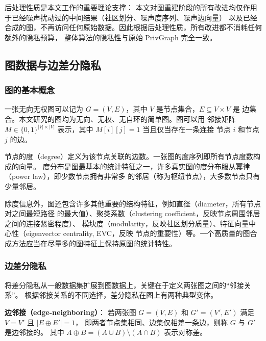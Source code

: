 \par 后处理性质是本文工作的重要理论支撑：
本文对图重建阶段的所有改进均仅作用于已经噪声扰动过的中间结果（社区划分、噪声度序列、噪声边向量）
以及已经合成的图，不再访问任何原始数据。因此根据后处理性质，所有改进都不消耗任何额外的隐私预算，
整体算法的隐私性与原始 PrivGraph 完全一致。

\subsection{图数据与边差分隐私}

\subsubsection{图的基本概念}

\par 一张无向无权图可以记为 $G = (V, E)$，其中 $V$ 是节点集合，$E \subseteq V \times V$ 是
边集合。本文研究的图均为无向、无权、无自环的简单图。图可以用
邻接矩阵 $M \in \{0, 1\}^{|V| \times |V|}$ 表示，其中 $M[i][j] = 1$ 当且仅当存在一条连接
节点 $i$ 和节点 $j$ 的边。

\par 节点的度（degree）定义为该节点关联的边数。一张图的度序列即所有节点度数构成的向量。
度分布是图最基本的统计特征之一，许多真实图的度分布服从幂律（power law），即少数节点拥有非常多
的邻居（称为枢纽节点），大多数节点只有少量邻居。

\par 除度信息外，图还包含许多其他重要的结构特征，例如直径（diameter，所有节点对之间最短路径
的最大值）、聚类系数（clustering coefficient，反映节点周围邻居之间的连接紧密程度）、
模块度（modularity，反映社区划分质量）、特征向量中心性（eigenvector centrality, EVC，反映
节点的重要性）等。一个高质量的图合成方法应当在尽量多的图特征上保持原图的统计特性。

\subsubsection{边差分隐私}

\par 将差分隐私从一般数据集扩展到图数据上，关键在于定义两张图之间的``邻接关系''。
根据邻接关系的不同选择，差分隐私在图上有两种典型变体。

\par \textbf{边邻接（edge-neighboring）}\cite{nissim_smooth_2007}：
若两张图 $G = (V, E)$ 和 $G' = (V', E')$ 满足 $V = V'$ 且 $|E \oplus E'| = 1$，
即两者节点集相同、边集仅相差一条边，则称 $G$ 与 $G'$ 是边邻接的。
其中 $A \oplus B = (A \cup B) \setminus (A \cap B)$ 表示对称差。

